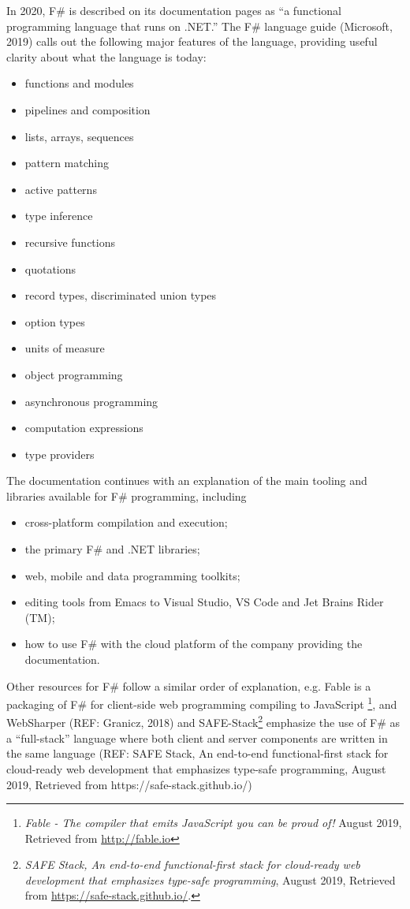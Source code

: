 \documentclass[acmsmall,review]{acmart}\settopmatter{printfolios=true,printccs=false,printacmref=false}
\begin{document}
In 2020, F\# is described on its documentation pages as “a functional programming language that runs on .NET.” The F\# language guide (Microsoft, 2019) calls out the following major features of the language, providing useful clarity about what the language is today:
\begin{itemize}
\item functions and modules
\item pipelines and composition
\item lists, arrays, sequences
\item pattern matching 
\item active patterns 
\item type inference
\item recursive functions
\item quotations
\item record types, discriminated union types
\item option types
\item units of measure
\item object programming
\item asynchronous programming
\item computation expressions
\item type providers
\end{itemize}
The documentation continues with an explanation of the main tooling and libraries available for F\# programming, including
\begin{itemize}
\item cross-platform compilation and execution;
\item the primary F\# and .NET libraries;
\item web, mobile and data programming toolkits;
\item editing tools from Emacs to Visual Studio, VS Code and Jet Brains Rider (TM);
\item how to use F\# with the cloud platform of the company providing the documentation.
\end{itemize}
Other resources for F\# follow a similar order of explanation, e.g. Fable  is a packaging of F\# for client-side web programming compiling to JavaScript \footnote{ \textit{Fable - The compiler that emits JavaScript you can be proud of!} August 2019, Retrieved from \url{http://fable.io}}, and WebSharper (REF: Granicz, 2018) and SAFE-Stack\footnote{\textit{SAFE Stack, An end-to-end functional-first stack for cloud-ready web development that emphasizes type-safe programming}, August 2019,  Retrieved from \url{https://safe-stack.github.io/}.} emphasize the use of F\# as a “full-stack” language where both client and server components are written in the same language (REF: SAFE Stack, An end-to-end functional-first stack for cloud-ready web development that emphasizes type-safe programming, August 2019,  Retrieved from https://safe-stack.github.io/)
\end{document}
